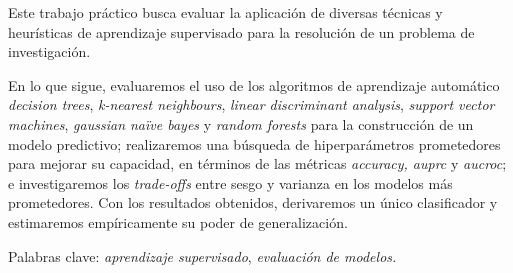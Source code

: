 Este trabajo práctico busca evaluar la aplicación de diversas técnicas y heurísticas de aprendizaje supervisado 
para la resolución de un problema de investigación. 


En lo que sigue, evaluaremos el uso de los algoritmos de aprendizaje automático \textit{decision trees}, \textit{k-nearest neighbours}, \textit{linear discriminant analysis}, \textit{support vector machines}, \textit{gaussian naïve bayes} y \textit{random forests} para la construcción de un modelo predictivo; realizaremos una búsqueda de hiperparámetros prometedores para mejorar su capacidad, en términos de las métricas \textit{accuracy, auprc} y \textit{aucroc}; e investigaremos los \textit{trade-offs} entre sesgo y varianza en los modelos más prometedores. Con los resultados obtenidos, derivaremos un único clasificador y estimaremos empíricamente su poder de generalización.


\vspace{1em}
\noindent Palabras clave: \textit{aprendizaje supervisado}, \textit{evaluación de modelos.}
